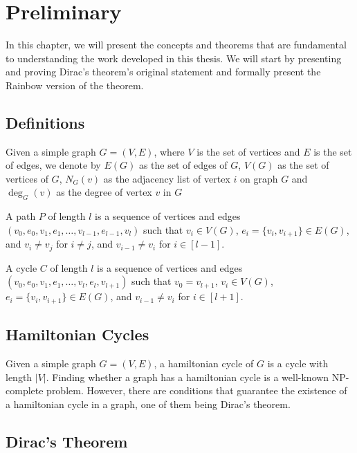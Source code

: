 
\chapter{Preliminary}

In this chapter, we will present the concepts and theorems that are fundamental to understanding the 
work developed in this thesis. We will start by presenting and proving Dirac's theorem's original
statement and formally present the Rainbow version of the theorem.

\section{Definitions}

Given a simple graph $G = (V, E)$, where $V$ is the set of vertices and $E$ is the set of edges, we denote by $E(G)$ as
the set of edges of $G$, $V(G)$ as the set of vertices of $G$, $N_G(v)$ as the adjacency list of vertex $i$ on graph $G$ 
and $\deg_G(v)$ as the degree of vertex $v$ in $G$

A path $P$ of length $l$ is a sequence of vertices and edges $(v_0, e_0, v_1, e_1, \ldots, v_{l - 1}, e_{l - 1}, v_{l})$ such that
$v_i \in V(G)$, $e_i = \{v_i, v_{i + 1}\} \in E(G)$, and $v_i \neq v_j$ for $i \neq j$, and $v_{i-1} \neq v_{i}$ for $i \in [l-1]$.

A cycle $C$ of length $l$ is a sequence of vertices and edges $(v_0, e_0, v_1, e_1, \ldots, v_{l}, e_{l}, v_{l + 1})$ such that
$v_{0} = v_{l + 1}$, $v_i \in V(G)$, $e_i = \{v_i, v_{i + 1}\} \in E(G)$, and $v_{i-1} \neq v_{i}$ for $i \in [l + 1]$.

\section{Hamiltonian Cycles}

Given a simple graph $G = (V, E)$, a hamiltonian cycle of $G$ is a cycle with length $|V|$.
Finding whether a graph has a hamiltonian cycle is a well-known NP-complete problem. 
However, there are conditions that guarantee the existence of a hamiltonian cycle in a graph, one of them being Dirac's theorem.

\section{Dirac's Theorem}

